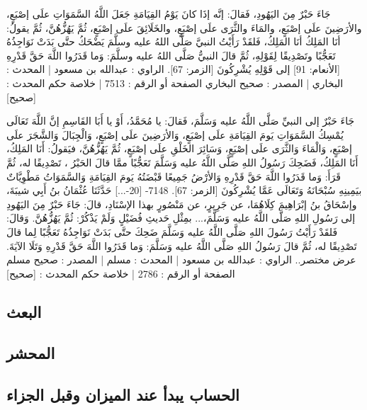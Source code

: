 جَاءَ حَبْرٌ مِنَ اليَهُودِ، فَقالَ: إنَّه إذَا كانَ يَوْمُ القِيَامَةِ جَعَلَ اللَّهُ السَّمَوَاتِ علَى إصْبَعٍ، والأرَضِينَ علَى إصْبَعٍ، والمَاءَ والثَّرَى علَى إصْبَعٍ، والخَلَائِقَ علَى إصْبَعٍ، ثُمَّ يَهُزُّهُنَّ، ثُمَّ يقولُ: أنَا المَلِكُ أنَا المَلِكُ، فَلقَدْ رَأَيْتُ النبيَّ صَلَّى اللهُ عليه وسلَّمَ يَضْحَكُ حتَّى بَدَتْ نَوَاجِذُهُ تَعَجُّبًا وتَصْدِيقًا لِقَوْلِهِ، ثُمَّ قالَ النبيُّ صَلَّى اللهُ عليه وسلَّمَ: {وَما قَدَرُوا اللَّهَ حَقَّ قَدْرِهِ} [الأنعام: 91] إلى قَوْلِهِ {يُشْرِكُونَ} [الزمر: 67].
الراوي : عبدالله بن مسعود | المحدث : البخاري | المصدر : صحيح البخاري
الصفحة أو الرقم : 7513 | خلاصة حكم المحدث : [صحيح]

جَاءَ حَبْرٌ إلى النبيِّ صَلَّى اللَّهُ عليه وَسَلَّمَ، فَقالَ: يا مُحَمَّدُ، أَوْ يا أَبَا القَاسِمِ إنَّ اللَّهَ تَعَالَى يُمْسِكُ السَّمَوَاتِ يَومَ القِيَامَةِ علَى إصْبَعٍ، وَالأرَضِينَ علَى إصْبَعٍ، وَالْجِبَالَ وَالشَّجَرَ علَى إصْبَعٍ، وَالْمَاءَ وَالثَّرَى علَى إصْبَعٍ، وَسَائِرَ الخَلْقِ علَى إصْبَعٍ، ثُمَّ يَهُزُّهُنَّ، فيَقولُ: أَنَا المَلِكُ، أَنَا المَلِكُ، فَضَحِكَ رَسُولُ اللهِ صَلَّى اللَّهُ عليه وَسَلَّمَ تَعَجُّبًا ممَّا قالَ الحَبْرُ ، تَصْدِيقًا له، ثُمَّ قَرَأَ: {وَما قَدَرُوا اللَّهَ حَقَّ قَدْرِهِ وَالأرْضُ جَمِيعًا قَبْضَتُهُ يَومَ القِيَامَةِ وَالسَّمَوَاتُ مَطْوِيَّاتٌ بيَمِينِهِ سُبْحَانَهُ وَتَعَالَى عَمَّا يُشْرِكُونَ} [الزمر: 67]. 7148- [20-...] حَدَّثَنَا عُثْمَانُ بنُ أَبِي شيبَةَ، وإسْحَاقُ بنُ إبْرَاهِيمَ كِلَاهُمَا، عن جَرِيرٍ، عن مَنْصُورٍ بهذا الإسْنَادِ، قالَ: جَاءَ حَبْرٌ مِنَ اليَهُودِ إلى رَسُولِ اللهِ صَلَّى اللَّهُ عليه وَسَلَّمَ،... بمِثْلِ حَديثِ فُضَيْلٍ وَلَمْ يَذْكُرْ: ثُمَّ يَهُزُّهُنَّ. وَقالَ: فَلقَدْ رَأَيْتُ رَسُولَ اللهِ صَلَّى اللَّهُ عليه وَسَلَّمَ ضَحِكَ حتَّى بَدَتْ نَوَاجِذُهُ تَعَجُّبًا لِما قالَ تَصْدِيقًا له، ثُمَّ قالَ رَسُولُ اللهِ صَلَّى اللَّهُ عليه وَسَلَّمَ: {وَما قَدَرُوا اللَّهَ حَقَّ قَدْرِهِ} وَتَلَا الآيَةَ.
عرض مختصر..
الراوي : عبدالله بن مسعود | المحدث : مسلم | المصدر : صحيح مسلم
الصفحة أو الرقم : 2786 | خلاصة حكم المحدث : [صحيح]

\subsection{البعث}

\subsection{المحشر}





\subsection{الحساب يبدأ عند الميزان وقبل الجزاء}


